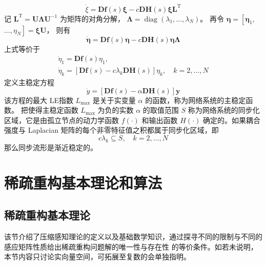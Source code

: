 \begin{equation}
    \dot{\xi}=\boldsymbol{D} \boldsymbol{f}(s) \boldsymbol{\xi}-c \boldsymbol{D} \boldsymbol{H}(s) \boldsymbol{\xi} \boldsymbol{L}^{\mathrm{T}}
\end{equation}
记 $\boldsymbol{L}^{\mathrm{T}}=\boldsymbol{U} \boldsymbol{\Lambda} \boldsymbol{U}^{-1}$ 为矩阵的对角分解，
$\boldsymbol{\Lambda}=\operatorname{diag}\left(\lambda_1, \ldots, \lambda_N\right)$。 
再令 $\boldsymbol{\eta}=\left[\boldsymbol{\eta}_1\right.$, $\left.\ldots, \eta_N\right]=\boldsymbol{\xi U}$， 则有
\begin{equation}
    \dot{\boldsymbol{\eta}}=\boldsymbol{D} \boldsymbol{f}(s) \boldsymbol{\eta}-c \boldsymbol{D} \boldsymbol{H}(s) \boldsymbol{\eta} \mathbf{\Lambda}
\end{equation}
上式等价于
\begin{equation}
    \begin{gathered}
    \dot{\eta}_1=\boldsymbol{D} \boldsymbol{f}(s) \eta_1, \\
    \dot{\eta}_k=\left[\boldsymbol{D} \boldsymbol{f}(s)-c \lambda_k \boldsymbol{D} \boldsymbol{H}(s)\right] \eta_k, \quad k=2, \ldots, N
    \end{gathered}
\end{equation}
定义主稳定方程
\begin{equation}
    \dot{y}=[\boldsymbol{D} \boldsymbol{f}(s)-\alpha \boldsymbol{D} \boldsymbol{H}(s)] \boldsymbol{y}
\end{equation}
该方程的最大 LE指数 $L_{\max }$ 是关于实变量 $\alpha$ 的函数，称为网络系统的主稳定函数。
把使得主稳定函数 $L_{\max }$ 为负的实数 $\alpha$ 的取值范围 $S$ 称为网络系统的同步化区域，它是由孤立节点的动力学函数 $f(\cdot)$ 和输出函数
$H(\cdot)$ 确定的。如果耦合强度与 Laplacian 矩阵的每个非零特征值之积都属于同步化区域，即
\begin{equation}
    c \lambda_k \subseteq S, \quad k=2, \ldots, N
\end{equation}
那么同步流形是渐近稳定的。
\section{稀疏重构基本理论和算法}
\subsection{稀疏重构基本理论}
该节介绍了压缩感知理论的定义以及基础数学知识，通过探寻不同的限制与不同的感应矩阵性质给出稀疏重构问题解的唯一性与存在性
的等价条件。如若未说明，本节内容只讨论实向量空间，可拓展至复数的会单独指明。
